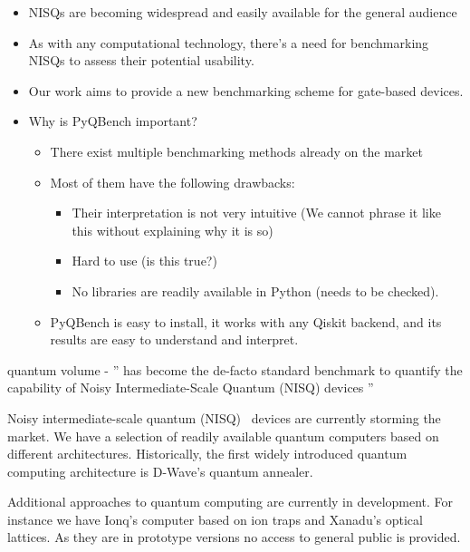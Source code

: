 \documentclass[preprint,12pt, a4paper, dvipsnames]{elsarticle}
\newcommand{\1}{{\rm 1\hspace{-0.9mm}l}}
\begin{document}
\begin{itemize}
	\item NISQs are becoming widespread and easily available for the general audience
	\item As with any computational technology, there's a need for benchmarking NISQs to assess
	their potential usability.
	\item Our work aims to provide a new benchmarking scheme for gate-based devices.
	\item Why is PyQBench important?
	\begin{itemize}
		\item There exist multiple benchmarking methods already on the market
		\item Most of them have the following drawbacks:
		\begin{itemize}
			\item Their interpretation is not very intuitive (We cannot phrase it like this without
			explaining why it is so)
			\item Hard to use (is this true?)
			\item No libraries are readily available in Python (needs to be checked).
		\end{itemize}
		\item PyQBench is easy to install, it works with any Qiskit backend, and its results are
		easy to understand and interpret.
	\end{itemize}
\end{itemize}






quantum volume - '' has become the de-facto standard benchmark to quantify the capability of Noisy Intermediate-Scale Quantum (NISQ) devices '' \cite{pelofske2022volume}





Noisy intermediate-scale quantum
(NISQ)~\cite{preskill} devices are currently storming the market. We
have a selection of readily available quantum computers based on different
architectures. Historically, the first widely introduced quantum computing
architecture is D-Wave's quantum annealer.



Additional approaches to quantum computing are currently in development. For
instance we have Ionq's computer based on ion traps and Xanadu's optical
lattices. As they are in prototype versions no access to general public is
provided.
\end{document}
